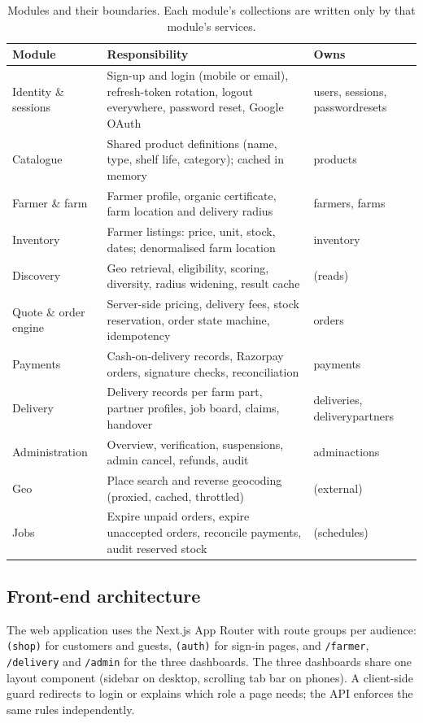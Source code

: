 \documentclass[11pt,a4paper]{article}
\begin{document}
\begin{table}[H]\centering\small
\begin{tabularx}{\linewidth}{@{}p{3.1cm}Lp{3.4cm}@{}}
\toprule
\textbf{Module} & \textbf{Responsibility} & \textbf{Owns} \\
\midrule
Identity \& sessions & Sign-up and login (mobile or email), refresh-token rotation, logout everywhere, password reset, Google OAuth & users, sessions, passwordresets \\
Catalogue & Shared product definitions (name, type, shelf life, category); cached in memory & products \\
Farmer \& farm & Farmer profile, organic certificate, farm location and delivery radius & farmers, farms \\
Inventory & Farmer listings: price, unit, stock, dates; denormalised farm location & inventory \\
Discovery & Geo retrieval, eligibility, scoring, diversity, radius widening, result cache & (reads) \\
Quote \& order engine & Server-side pricing, delivery fees, stock reservation, order state machine, idempotency & orders \\
Payments & Cash-on-delivery records, Razorpay orders, signature checks, reconciliation & payments \\
Delivery & Delivery records per farm part, partner profiles, job board, claims, handover & deliveries, deliverypartners \\
Administration & Overview, verification, suspensions, admin cancel, refunds, audit & adminactions \\
Geo & Place search and reverse geocoding (proxied, cached, throttled) & (external) \\
Jobs & Expire unpaid orders, expire unaccepted orders, reconcile payments, audit reserved stock & (schedules) \\
\bottomrule
\end{tabularx}
\caption{Modules and their boundaries. Each module's collections are written only by that module's services.}
\label{tab:modules}
\end{table}

\subsection{Front-end architecture}

The web application uses the Next.js App Router with route groups per audience: \texttt{(shop)} for customers and guests, \texttt{(auth)} for sign-in pages, and \texttt{/farmer}, \texttt{/delivery} and \texttt{/admin} for the three dashboards. The three dashboards share one layout component (sidebar on desktop, scrolling tab bar on phones). A client-side guard redirects to login or explains which role a page needs; the API enforces the same rules independently.
\end{document}
